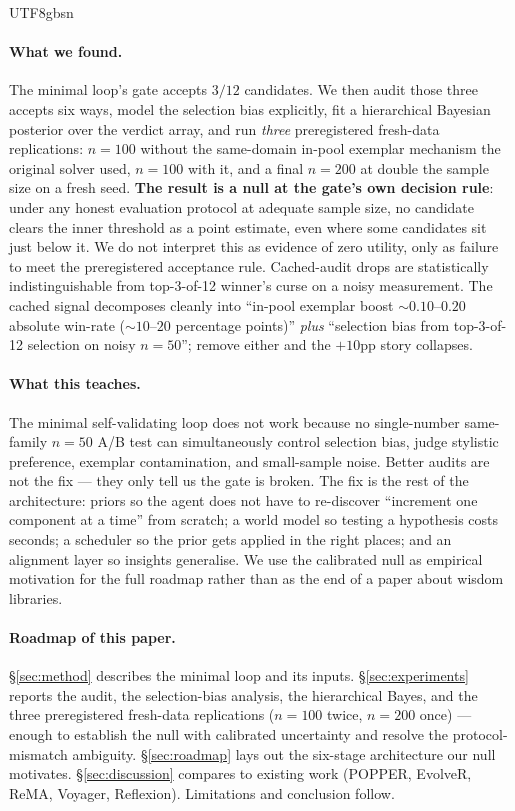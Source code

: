 \documentclass{article}
\begin{document}
\begin{CJK*}{UTF8}{gbsn}
\paragraph{What we found.}
The minimal loop's gate accepts \(3/12\) candidates. We then
audit those three accepts six ways, model the selection bias
explicitly, fit a hierarchical Bayesian posterior over the
verdict array, and run \emph{three} preregistered fresh-data
replications: \(n=100\) without the same-domain in-pool
exemplar mechanism the original solver used, \(n=100\) with it,
and a final \(n=200\) at double the sample size on a fresh seed.
\textbf{The result is a null at the gate's own decision rule}:
under any honest evaluation protocol at adequate sample size, no
candidate clears the inner threshold as a point estimate, even
where some candidates sit just below it. We do not interpret
this as evidence of zero utility, only as failure to meet the
preregistered acceptance rule.
Cached-audit drops are statistically indistinguishable from
top-3-of-12 winner's curse on a noisy measurement. The cached
signal decomposes cleanly into ``in-pool exemplar boost \(\sim
0.10\)--\(0.20\) absolute win-rate (\({\sim} 10\)--\(20\)
percentage points)'' \emph{plus} ``selection bias from
top-3-of-12 selection on noisy \(n=50\)''; remove either and
the \(+10\)pp story collapses.

\paragraph{What this teaches.}
The minimal self-validating loop does not work because no
single-number same-family \(n=50\) A/B test can simultaneously
control selection bias, judge stylistic preference, exemplar
contamination, and small-sample noise. Better audits are not the
fix --- they only tell us the gate is broken. The fix is the
rest of the architecture: priors so the agent does not have to
re-discover ``increment one component at a time'' from scratch; a
world model so testing a hypothesis costs seconds; a scheduler so
the prior gets applied in the right places; and an alignment
layer so insights generalise. We use the calibrated null as
empirical motivation for the full roadmap rather than as the end
of a paper about wisdom libraries.

\paragraph{Roadmap of this paper.}
\S\ref{sec:method} describes the minimal loop and its inputs.
\S\ref{sec:experiments} reports the audit, the selection-bias
analysis, the hierarchical Bayes, and the three preregistered
fresh-data replications (\(n=100\) twice, \(n=200\) once) --- enough
to establish the null with calibrated uncertainty and resolve the
protocol-mismatch ambiguity. \S\ref{sec:roadmap} lays out the six-stage
architecture our null motivates. \S\ref{sec:discussion} compares
to existing work (POPPER, EvolveR, ReMA, Voyager, Reflexion).
Limitations and conclusion follow.


\end{CJK*}
\end{document}
